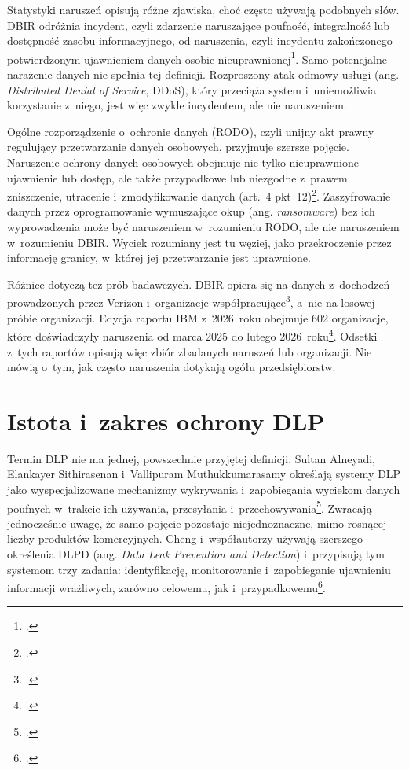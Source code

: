 \documentclass[12pt,a4paper]{article}
\begin{document}
Statystyki naruszeń opisują różne zjawiska, choć często używają podobnych
słów. DBIR odróżnia incydent, czyli zdarzenie naruszające poufność,
integralność lub dostępność zasobu informacyjnego, od naruszenia, czyli
incydentu zakończonego potwierdzonym ujawnieniem danych osobie
nieuprawnionej\footcite{verizon2024dbir}. Samo potencjalne narażenie danych
nie spełnia tej definicji. Rozproszony atak odmowy usługi (ang.
\emph{Distributed Denial of Service}, DDoS), który przeciąża system
i~uniemożliwia korzystanie z~niego, jest więc zwykle incydentem, ale nie
naruszeniem.

Ogólne rozporządzenie o~ochronie danych (RODO), czyli unijny akt prawny
regulujący przetwarzanie danych osobowych, przyjmuje szersze pojęcie. Naruszenie ochrony danych osobowych obejmuje
nie tylko nieuprawnione ujawnienie lub dostęp, ale także przypadkowe lub
niezgodne z~prawem zniszczenie, utracenie i~zmodyfikowanie danych (art.~4
pkt~12)\footcite{rodo2016}. Zaszyfrowanie danych przez oprogramowanie
wymuszające okup (ang. \emph{ransomware}) bez ich wyprowadzenia może być naruszeniem w~rozumieniu RODO, ale
nie naruszeniem w~rozumieniu DBIR. Wyciek rozumiany jest tu węziej, jako
przekroczenie przez informację granicy, w~której jej przetwarzanie
jest uprawnione.

Różnice dotyczą też prób badawczych. DBIR opiera się na danych z~dochodzeń
prowadzonych przez Verizon i~organizacje
współpracujące\footcite{verizon2024dbir}, a~nie na losowej próbie
organizacji. Edycja raportu IBM z~2026~roku obejmuje 602 organizacje, które
doświadczyły naruszenia od marca 2025 do lutego 2026~roku\footcite{ibm2026cost}.
Odsetki z~tych raportów opisują więc zbiór zbadanych naruszeń lub
organizacji. Nie mówią o~tym, jak często naruszenia dotykają ogółu
przedsiębiorstw.

\section{Istota i~zakres ochrony DLP}

Termin DLP nie ma jednej, powszechnie przyjętej definicji. Sultan Alneyadi,
Elankayer Sithirasenan i~Vallipuram Muthukkumarasamy określają systemy DLP
jako wyspecjalizowane mechanizmy wykrywania i~zapobiegania wyciekom danych
poufnych w~trakcie ich używania, przesyłania i~przechowywania\footcite{alneyadi2016survey}.
Zwracają jednocześnie uwagę, że samo pojęcie pozostaje niejednoznaczne, mimo
rosnącej liczby produktów komercyjnych. Cheng i~współautorzy używają
szerszego określenia DLPD (ang. \emph{Data Leak Prevention and Detection})
i~przypisują tym systemom trzy zadania: identyfikację, monitorowanie
i~zapobieganie ujawnieniu informacji wrażliwych, zarówno celowemu, jak
i~przypadkowemu\footcite{cheng2017enterprise}.
\end{document}
